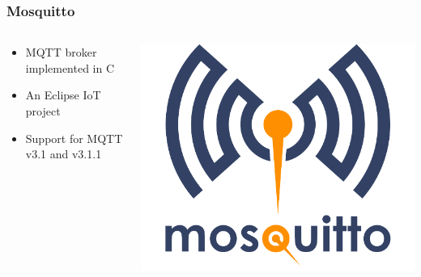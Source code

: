 \documentclass[aspectratio=169,11pt,hyperref={colorlinks=true}]{beamer}
\begin{document}
\begin{frame}
    \frametitle{Mosquitto}
    \begin{columns}[T]
        \begin{column}{.48\textwidth}
            \begin{itemize}
                \item MQTT broker implemented in C
                \item An Eclipse IoT project
                \item Support for MQTT v3.1 and v3.1.1
            \end{itemize}
        \end{column}
        \begin{column}{.48\textwidth}
            \includegraphics[width=\textwidth]{mosquitto.png}
        \end{column}
    \end{columns}
\end{frame}
\end{document}
